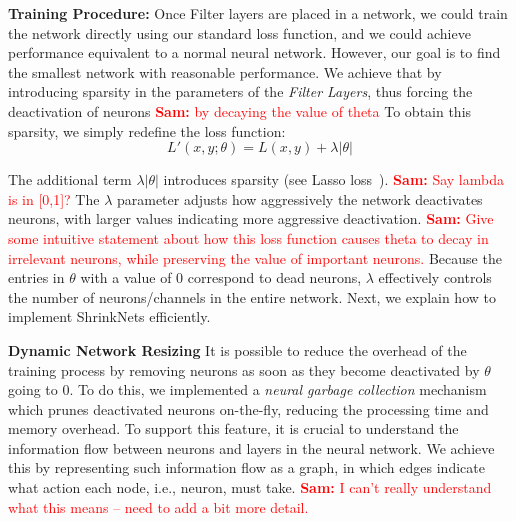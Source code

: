 \documentclass[sigconf]{acmart}
\newcommand{\srm}[1]{\textcolor{red}{{\bf Sam:} #1}}
\newcommand{\gl}[1]{\textcolor{violet}{{\bf Gl:} #1}}
\begin{document}
\textbf{Training Procedure: } Once Filter layers are placed in a network, 
we could train the network directly using our standard loss function, and we could achieve performance equivalent to a normal neural
network. However, our goal is to find the smallest network with reasonable
performance. We achieve that by introducing sparsity in the parameters of the
\textit{Filter Layers}, thus forcing the deactivation of neurons \srm{by decaying the value of theta}
To obtain this sparsity, we simply redefine the loss function:
\vspace{-.5em}
\begin{equation}
  L'(x,y;\theta) = L(x, y) + \lambda|\theta|
\end{equation}

The additional term $\lambda|\theta|$ introduces sparsity (see Lasso
loss~\cite{Tibshirani1996}). \srm{Say lambda is in [0,1]?}
The $\lambda$ parameter adjusts how aggressively the network deactivates neurons,
with larger values indicating more aggressive deactivation. \srm{Give some intuitive statement about how this loss function causes theta to decay in irrelevant neurons, while preserving the value of important neurons.}
Because the entries in $\theta$ with a value of $0$
correspond to dead neurons, $\lambda$ effectively controls the number of
neurons/channels in the entire network.  
Next, we explain how to implement
ShrinkNets efficiently.

\textbf{Dynamic Network Resizing}
It is possible to reduce the overhead of the training process by removing
neurons as soon as they become deactivated by $\theta$ going to 0.
To do this, we implemented a \emph{neural garbage collection} mechanism which
prunes deactivated neurons on-the-fly,  reducing the processing time
and memory overhead. To support this feature, it is crucial to understand the
information flow between neurons and layers in the neural network. We achieve
this by representing such information flow as a graph, in which edges indicate
what action each node, i.e., neuron, must take. 
\srm{I can't really understand what this means -- need to add a bit more detail.}
\end{document}
